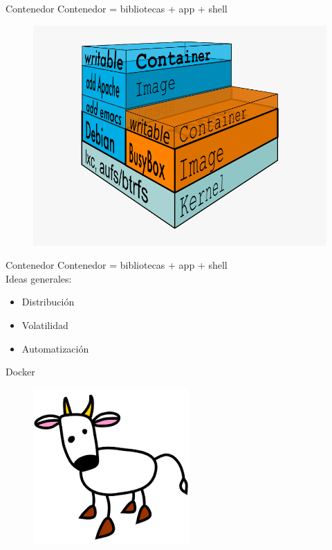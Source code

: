 \documentclass{beamer}
\begin{document}
\begin{frame}{Contenedor}
Contenedor = bibliotecas + app + shell
\begin{figure}
\centering
\includegraphics[width=0.8\linewidth]{Images/container.png}
\label{fig:container}
\end{figure}
\end{frame}

\begin{frame}{Contenedor}
Contenedor = bibliotecas + app + shell\\

Ideas generales:
\begin{itemize}
	\item Distribución
	\item Volatilidad
	\item Automatización
\end{itemize}
\end{frame}

\begin{frame}{Docker}
\begin{figure}
	\centering
	\includegraphics[width=0.6\linewidth]{Images/larry}
\end{figure}
\end{frame}
\end{document}
